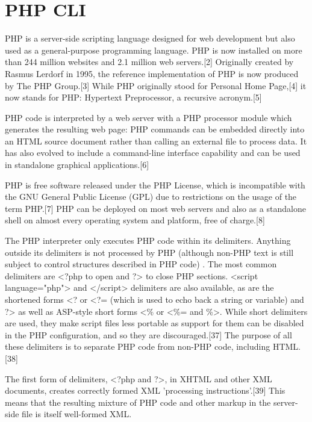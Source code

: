 	
	
	
	\newpage
	\section{PHP CLI}
	
	PHP is a server-side scripting language designed for web development but also used as a general-purpose programming language. PHP is now installed on more than 244 million websites and 2.1 million web servers.[2] Originally created by Rasmus Lerdorf in 1995, the reference implementation of PHP is now produced by The PHP Group.[3] While PHP originally stood for Personal Home Page,[4] it now stands for PHP: Hypertext Preprocessor, a recursive acronym.[5]
	
	\vpara
	PHP code is interpreted by a web server with a PHP processor module which generates the resulting web page: PHP commands can be embedded directly into an HTML source document rather than calling an external file to process data. It has also evolved to include a command-line interface capability and can be used in standalone graphical applications.[6]
	
	\vpara
	PHP is free software released under the PHP License, which is incompatible with the GNU General Public License (GPL) due to restrictions on the usage of the term PHP.[7] PHP can be deployed on most web servers and also as a standalone shell on almost every operating system and platform, free of charge.[8]
	
	\vpara
	The PHP interpreter only executes PHP code within its delimiters. Anything outside its delimiters is not processed by PHP (although non-PHP text is still subject to control structures described in PHP code) . The most common delimiters are <?php to open and ?> to close PHP sections. <script language="php"> and </script> delimiters are also available, as are the shortened forms <? or <?= (which is used to echo back a string or variable) and ?> as well as ASP-style short forms <\% or <\%= and \%>. While short delimiters are used, they make script files less portable as support for them can be disabled in the PHP configuration, and so they are discouraged.[37] The purpose of all these delimiters is to separate PHP code from non-PHP code, including HTML.[38]
	
	\vpara
	The first form of delimiters, <?php and ?>, in XHTML and other XML documents, creates correctly formed XML 'processing instructions'.[39] This means that the resulting mixture of PHP code and other markup in the server-side file is itself well-formed XML.
	
